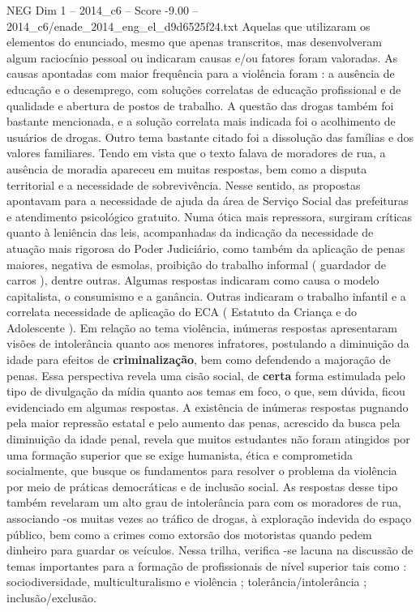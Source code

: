 \begin{textsample}{NEG Dim 1 – 2014\_c6 – Score -9.00 – 2014\_c6/enade\_2014\_eng\_el\_d9d6525f24.txt}
Aquelas que utilizaram os elementos do enunciado, mesmo que apenas transcritos, mas desenvolveram algum raciocínio pessoal ou indicaram causas e/ou fatores foram valoradas.
As causas apontadas com maior frequência para a violência foram : a ausência de educação e o desemprego, com soluções correlatas de educação profissional e de qualidade e abertura de postos de trabalho.
A questão das drogas também foi bastante mencionada, e a solução correlata mais indicada foi o acolhimento de usuários de drogas.
Outro tema bastante citado foi a dissolução das famílias e dos valores familiares.
Tendo em vista que o texto falava de moradores de rua, a ausência de moradia apareceu em muitas respostas, bem como a disputa territorial e a necessidade de sobrevivência.
Nesse sentido, as propostas apontavam para a necessidade de ajuda da área de Serviço Social das prefeituras e atendimento psicológico gratuito.
Numa ótica mais repressora, surgiram críticas quanto à leniência das leis, acompanhadas da indicação da necessidade de atuação mais rigorosa do Poder Judiciário, como também da aplicação de penas maiores, negativa de esmolas, proibição do trabalho informal ( guardador de carros ), dentre outras.
Algumas respostas indicaram como causa o modelo capitalista, o consumismo e a ganância.
Outras indicaram o trabalho infantil e a correlata necessidade de aplicação do ECA ( Estatuto da Criança e do Adolescente ).
Em relação ao tema violência, inúmeras respostas apresentaram visões de intolerância quanto aos menores infratores, postulando a diminuição da idade para efeitos de \textbf{criminalização}, bem como defendendo a majoração de penas.
Essa perspectiva revela uma cisão social, de \textbf{certa} forma estimulada pelo tipo de divulgação da mídia quanto aos temas em foco, o que, sem dúvida, ficou evidenciado em algumas respostas.
A existência de inúmeras respostas pugnando pela maior repressão estatal e pelo aumento das penas, acrescido da busca pela diminuição da idade penal, revela que muitos estudantes não foram atingidos por uma formação superior que se exige humanista, ética e comprometida socialmente, que busque os fundamentos para resolver o problema da violência por meio de práticas democráticas e de inclusão social.
As respostas desse tipo também revelaram um alto grau de intolerância para com os moradores de rua, associando -os muitas vezes ao tráfico de drogas, à exploração indevida do espaço público, bem como a crimes como extorsão dos motoristas quando pedem dinheiro para guardar os veículos.
Nessa trilha, verifica -se lacuna na discussão de temas importantes para a formação de profissionais de nível superior tais como : sociodiversidade, multiculturalismo e violência ; tolerância/intolerância ; inclusão/exclusão.

\end{textsample}
